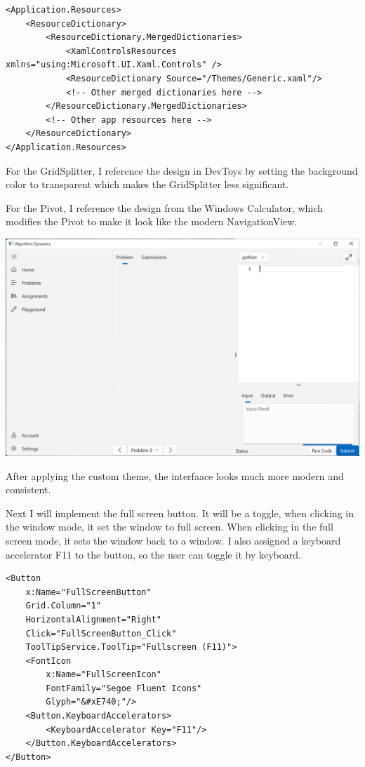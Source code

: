 \documentclass[a4paper]{report}
\begin{document}
\begin{verbatim}
<Application.Resources>
    <ResourceDictionary>
        <ResourceDictionary.MergedDictionaries>
            <XamlControlsResources xmlns="using:Microsoft.UI.Xaml.Controls" />
            <ResourceDictionary Source="/Themes/Generic.xaml"/>
            <!-- Other merged dictionaries here -->
        </ResourceDictionary.MergedDictionaries>
        <!-- Other app resources here -->
    </ResourceDictionary>
</Application.Resources>
\end{verbatim}

For the GridSplitter, I reference the design in DevToys\cite{github:DevToys:Generic.xaml} by setting the background color to transparent which makes the GridSplitter less significant.

For the Pivot, I reference the design from the Windows Calculator\cite{github:calculator:Calculator.xaml}, which modifies the Pivot to make it look like the modern NavigationView.

\includegraphics[width=\textwidth, height=\textheight, keepaspectratio]{CodingPage-Theme}

After applying the custom theme, the interfaace looks much more modern and consistent.

Next I will implement the full screen button. It will be a toggle, when clicking in the window mode, it set the window to full screen. When clicking in the full screen mode, it sets the window back to a window. I also assigned a keyboard accelerator F11 to the button, so the user can toggle it by keyboard.

\begin{verbatim}
<Button
    x:Name="FullScreenButton"
    Grid.Column="1"
    HorizontalAlignment="Right"
    Click="FullScreenButton_Click"
    ToolTipService.ToolTip="Fullscreen (F11)">
    <FontIcon
        x:Name="FullScreenIcon"
        FontFamily="Segoe Fluent Icons"
        Glyph="&#xE740;"/>
    <Button.KeyboardAccelerators>
        <KeyboardAccelerator Key="F11"/>
    </Button.KeyboardAccelerators>
</Button>
\end{verbatim}
\end{document}
